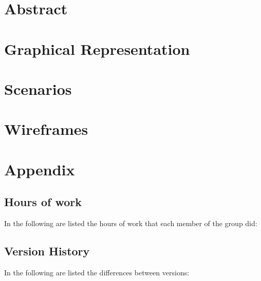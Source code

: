 \documentclass{../Common/Structure/doc_pdf}
\begin{document}
\titleToc

\chapter{Abstract}
\chapter{Graphical Representation}
\chapter{Scenarios}
\chapter{Wireframes}
\appendix
\chapter{Appendix}

\section{Hours of work}
In the following are listed the hours of work that each member of the group did:
\newpage
\section{Version History}
In the following are listed the differences between versions:
\end{document}
